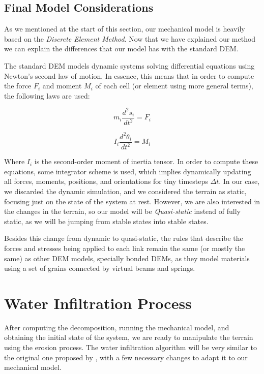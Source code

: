 \subsection{Final Model Considerations}
As we mentioned at the start of this section, our mechanical model is 
heavily based on the \textit{Discrete Element Method}. Now that we have 
explained our method we can explain the differences that our model has 
with the standard DEM.

\vspace{10pt}

The standard DEM models dynamic systems solving differential equations
using Newton's second law of motion. In essence, this means that 
in order to compute the force $F_i$ and moment $M_i$ of each cell (or element using more general terms), 
the following laws are used:

\begin{equation}
    m_i \frac{d^2s_i}{dt^2} = F_i
\end{equation}

\begin{equation}
    I_i \frac{d^2\theta_i}{dt^2} = M_i
\end{equation}

Where $I_i$ is the second-order moment of inertia tensor. In order to 
compute these equations, some integrator scheme is used, which implies
dynamically updating all forces, moments, positions, and orientations for tiny 
timesteps $\Delta t$. In  our case, we discarded the dynamic simulation, 
and we considered the terrain as static, focusing just on 
the state of the system at rest. However, we are also interested in 
the changes in the terrain, so our model will be \textit{Quasi-static}
instead of fully static, as we will be jumping from stable states 
into stable states. 

\vspace{10pt}

Besides this change from dynamic to quasi-static, the rules that describe 
the forces and stresses being applied to each link remain the same 
(or mostly the same) as other DEM models, specially bonded DEMs, as they  
model materials using a set of grains connected by virtual beams and springs.
\section{Water Infiltration Process}
After computing the decomposition, running the mechanical model, and 
obtaining the initial state of the 
system, we are ready to manipulate the terrain using the erosion process. The 
water infiltration algorithm will be very similar to the original one 
proposed by \cite{10.2312:ceig.20241139}, with a few necessary changes 
to adapt it to our mechanical model.

